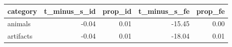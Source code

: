 \begin{table}[ht]
\centering
\begin{tabular}{lrrrr}
  \hline
category & t\_minus\_s\_id & prop\_id & t\_minus\_s\_fe & prop\_fe \\ 
  \hline
animals & -0.04 & 0.01 & -15.45 & 0.00 \\ 
  artifacts & -0.04 & 0.01 & -18.04 & 0.01 \\ 
   \hline
\end{tabular}
\end{table}

